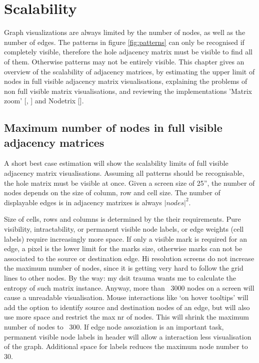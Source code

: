 \chapter{Scalability}
\label{chap:Scalability}

Graph visualizations are always limited by the number of nodes, as well as the number of edges. The patterns in figure \ref{fig:patterns} can only be recognised if completely visible, therefore the hole adjacency matrix must be visible to find all of them. Otherwise patterns may not be entirely visible. This chapter gives an overview of the scalability of adjacency matrices, by estimating the upper limit of nodes in full visible adjacency matrix visualisations, explaining the problems of non full visible matrix visualisations, and reviewing the implementations 'Matrix zoom' [\cite{ham}, \cite{abello}] and Nodetrix [\cite{henry}].


\section{Maximum number of nodes in full visible adjacency matrices}
A short best case estimation will show the scalability limits of full visible adjacency matrix visualisations. Assuming all patterns should be recognisable, the hole matrix must be visible at once. Given a screen size of 25”, the number of nodes depends on the size of column, row and cell size. The number of displayable edges is in adjacency matrixes is always $|nodes|^2$.

Size of cells, rows and columns is determined by the their requirements. Pure visibility, intractability, or permanent visible node labels, or edge weights (cell labels) require increasingly more space.
If only a visible mark is required for an edge, a pixel is the lower limit for the marks size, otherwise marks can not be associated to the source or destination edge. Hi resolution screens do not increase the maximum number of nodes, since it is getting very hard to follow the grid lines to other nodes. By the way: my dsit trauma wants me to calculate the entropy of such matrix instance. Anyway, more than ~3000 nodes on a screen will cause a unreadable visualisation.
Mouse interactions like ‘on hover tooltips’ will add the option to identify source and destination nodes of an edge, but will also use more space and restrict the max nr of nodes. This will shrink the maximum number of nodes to ~300.
If edge node assoziation is an important task, permanent visible node labels in header will allow a interaction less visualisation of the graph. Additional space for labels reduces the maximum node number to 30.
 
